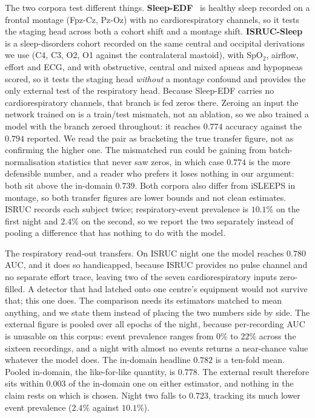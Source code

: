 \documentclass{ieeeaccess}
\newcommand{\mmAcc}{0.739}   %
\newcommand{\mmAuc}{0.782}   %
\begin{document}
The two corpora test different things. \textbf{Sleep-EDF}~\cite{kemp2000sleepedf}
is healthy sleep recorded on a frontal montage (Fpz-Cz, Pz-Oz) with no cardiorespiratory
channels, so it tests the staging head across both a cohort shift and a montage shift.
\textbf{ISRUC-Sleep}~\cite{khalighi2016isruc} is a sleep-disorders cohort recorded on the
same central and occipital derivations we use (C4, C3, O2, O1 against the contralateral
mastoid), with SpO$_2$, airflow, effort and ECG, and with obstructive, central and mixed
apneas and hypopneas scored, so it tests the staging head \emph{without} a montage
confound and provides the only external test of the respiratory head. Because Sleep-EDF
carries no cardiorespiratory channels, that branch is fed zeros there. Zeroing an input the
network trained on is a train/test mismatch, not an ablation, so we also trained a
model with the branch zeroed throughout: it reaches $0.774$ accuracy against the $0.794$
reported. We read the pair as bracketing the true transfer figure, not as confirming the
higher one. The mismatched run could be gaining from batch-normalisation statistics that never
saw zeros, in which case $0.774$ is the more defensible number, and a reader who prefers it
loses nothing in our argument: both sit above the in-domain $\mmAcc$. Both corpora
also differ from iSLEEPS in montage, so both transfer figures are lower bounds and not
clean estimates. ISRUC records each
subject twice; respiratory-event prevalence is $10.1\%$ on the first night and $2.4\%$ on
the second, so we report the two separately instead of pooling a difference that has
nothing to do with the model.

The respiratory read-out transfers. On ISRUC night one the model reaches
$0.780$ AUC, and it does so handicapped, because ISRUC provides no pulse channel and no
separate effort trace, leaving two of the seven cardiorespiratory inputs zero-filled. A
detector that had latched onto one centre's equipment would not survive that; this one does.
The comparison needs its estimators matched to mean anything, and we state them instead of
placing the two numbers side by side. The external figure is pooled over all epochs of the
night, because per-recording AUC is unusable on this corpus: event prevalence ranges from
$0\%$ to $22\%$ across the sixteen recordings, and a night with almost no events returns a
near-chance value whatever the model does. The in-domain headline $\mmAuc$ is a ten-fold mean.
Pooled in-domain, the like-for-like quantity, is $0.778$. The external result therefore
sits within $0.003$ of the in-domain one on either estimator, and nothing in the claim rests
on which is chosen. Night two falls to $0.723$, tracking its
much lower event prevalence ($2.4\%$ against $10.1\%$).
\end{document}
